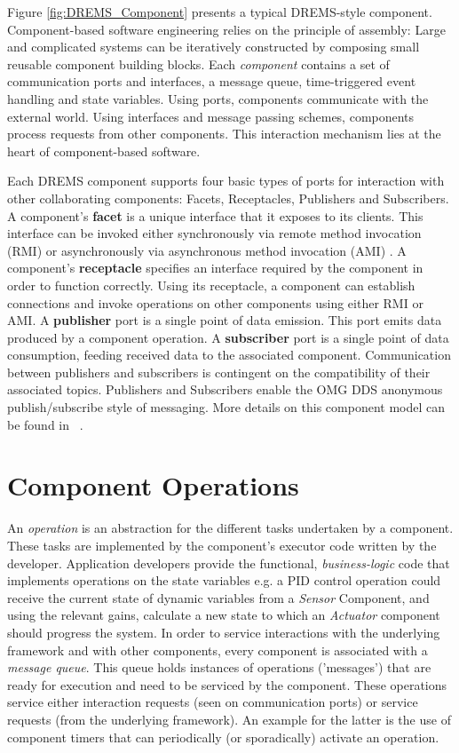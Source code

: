 Figure \ref{fig:DREMS_Component} presents a typical DREMS-style component. Component-based software engineering relies on the principle of assembly: Large and complicated systems can be iteratively constructed by composing small reusable component building blocks. Each \emph{component} contains a set of communication ports and interfaces, a message queue, time-triggered event handling and state variables. Using ports, components communicate with the external world. Using interfaces and message passing schemes, components process requests from other components. This interaction mechanism lies at the heart of component-based software. 

Each DREMS component supports four basic types of ports for interaction with other collaborating components: Facets, Receptacles, Publishers and Subscribers. A component's {\bf facet} is a unique interface that it exposes to its clients. This interface can be invoked either synchronously via remote method invocation (RMI) or asynchronously via asynchronous method invocation (AMI) \cite{waldo1998remote, raje1997asynchronous}. A component's {\bf receptacle} specifies an interface required by the component in order to function correctly. Using its receptacle, a component can establish connections and invoke operations on other components using either RMI or AMI. A {\bf publisher} port is a single point of data emission. This port emits data produced by a component operation. A {\bf subscriber} port is a single point of data consumption, feeding received data to the associated component. Communication between publishers and subscribers is contingent on the compatibility of their associated topics. Publishers and Subscribers enable the OMG DDS anonymous publish/subscribe \cite{eugster2003many} style of messaging. More details on this component model can be found in ~\cite{ISIS_F6_ISORC:13}.

\section{Component Operations}

An \emph{operation} is an abstraction for the different tasks undertaken by a component. These tasks are implemented by the component's executor code written by the developer. Application developers provide the functional, \emph{business-logic} code that implements operations on the state variables e.g. a PID control operation could receive the current state of dynamic variables from a \emph{Sensor} Component, and using the relevant gains, calculate a new state to which an \emph{Actuator} component should progress the system. In order to service interactions with the underlying framework and with other components, every component is associated with a \emph{message queue}. This queue holds instances of operations ('messages') that are ready for execution and need to be serviced by the component. These operations service either interaction requests (seen on communication ports) or service requests (from the underlying framework). An example for the latter is the use of component timers that can periodically (or sporadically) activate an operation. 

